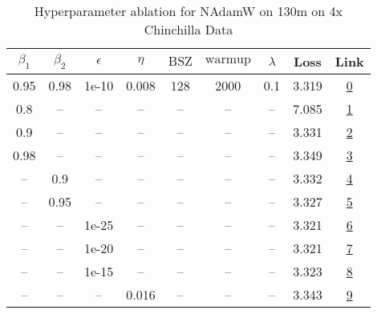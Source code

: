 \begin{table}[H]
\centering
\caption{Hyperparameter ablation for NAdamW on 130m on 4x Chinchilla Data}
\label{tab:ablation_nadamw_130m_4}
\begin{tabular}{ccccccccc}
\toprule
$\beta_1$ & $\beta_2$ & $\epsilon$ & $\eta$ & $\mathrm{BSZ}$ & $\mathrm{warmup}$ & $\lambda$ & Loss & Link \\
\midrule
0.95 & 0.98 & 1e-10 & 0.008 & 128 & 2000 & 0.1 & 3.319 & \href{https://wandb.ai/stanford-mercury/optimizer-scaling/runs/sweep-130m-10B-nadamwaee88elr0.008-wd0.1-minlr0-warmup2000-b10.9-75fe1d}{0} \\
\midrule
0.8 & -- & -- & -- & -- & -- & -- & 7.085 & \href{https://wandb.ai/stanford-mercury/optimizer-scaling/runs/sweep-130m-10B-nadamw3ae24elr0.008-wd0.1-minlr0-warmup2000-b10.8-cd4bbc}{1} \\
0.9 & -- & -- & -- & -- & -- & -- & 3.331 & \href{https://wandb.ai/stanford-mercury/optimizer-scaling/runs/sweep-130m-10B-nadamw7ebd66lr0.008-wd0.1-minlr0-warmup2000-b10.9-359641}{2} \\
0.98 & -- & -- & -- & -- & -- & -- & 3.349 & \href{https://wandb.ai/stanford-mercury/optimizer-scaling/runs/sweep-130m-10B-nadamwc3eccalr0.008-wd0.1-minlr0-warmup2000-b10.9-3589de}{3} \\
-- & 0.9 & -- & -- & -- & -- & -- & 3.332 & \href{https://wandb.ai/stanford-mercury/optimizer-scaling/runs/sweep-130m-10B-nadamw0503eblr0.008-wd0.1-minlr0-warmup2000-b10.9-77f1a7}{4} \\
-- & 0.95 & -- & -- & -- & -- & -- & 3.327 & \href{https://wandb.ai/stanford-mercury/optimizer-scaling/runs/sweep-130m-10B-nadamwa45c4blr0.008-wd0.1-minlr0-warmup2000-b10.9-8bcacb}{5} \\
-- & -- & 1e-25 & -- & -- & -- & -- & 3.321 & \href{https://wandb.ai/stanford-mercury/optimizer-scaling/runs/sweep-130m-10B-nadamw23255flr0.008-wd0.1-minlr0-warmup2000-b10.9-5c4387}{6} \\
-- & -- & 1e-20 & -- & -- & -- & -- & 3.321 & \href{https://wandb.ai/stanford-mercury/optimizer-scaling/runs/sweep-130m-10B-nadamweddb28lr0.008-wd0.1-minlr0-warmup2000-b10.9-74d910}{7} \\
-- & -- & 1e-15 & -- & -- & -- & -- & 3.323 & \href{https://wandb.ai/stanford-mercury/optimizer-scaling/runs/sweep-130m-10B-nadamwb0fef6lr0.008-wd0.1-minlr0-warmup2000-b10.9-4497ae}{8} \\
-- & -- & -- & 0.016 & -- & -- & -- & 3.343 & \href{https://wandb.ai/stanford-mercury/optimizer-scaling/runs/sweep-130m-10B-nadamwp178376lr0.016-wd0.1-minlr0-warmup2000-b10.-3dd959}{9} \\

\end{tabular}
\end{table}
